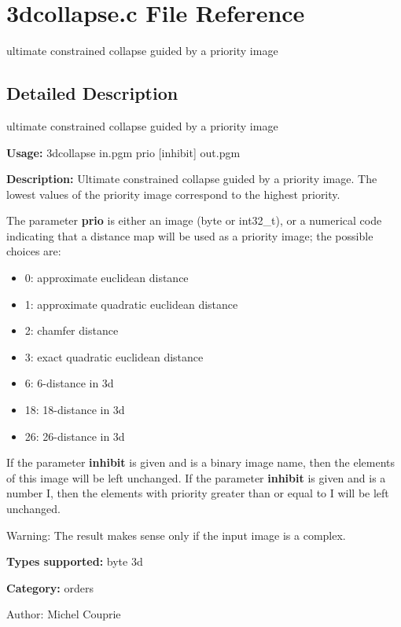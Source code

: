 \section{3dcollapse.c File Reference}
\label{3dcollapse_8c}
ultimate constrained collapse guided by a priority image  




\label{_details}
\subsection{Detailed Description}
ultimate constrained collapse guided by a priority image 

{\bf Usage:} 3dcollapse in.pgm prio [inhibit] out.pgm

{\bf Description:} Ultimate constrained collapse guided by a priority image. The lowest values of the priority image correspond to the highest priority.

The parameter {\bf prio} is either an image (byte or int32\_\-t), or a numerical code indicating that a distance map will be used as a priority image; the possible choices are: \begin{itemize}
\item 0: approximate euclidean distance \item 1: approximate quadratic euclidean distance \item 2: chamfer distance \item 3: exact quadratic euclidean distance \item 6: 6-distance in 3d \item 18: 18-distance in 3d \item 26: 26-distance in 3d\end{itemize}
If the parameter {\bf inhibit} is given and is a binary image name, then the elements of this image will be left unchanged. If the parameter {\bf inhibit} is given and is a number I, then the elements with priority greater than or equal to I will be left unchanged.

\begin{Desc}
\item[Warning:]The result makes sense only if the input image is a complex.\end{Desc}
{\bf Types supported:} byte 3d

{\bf Category:} orders

\begin{Desc}
\item[Author:]Michel Couprie \end{Desc}
